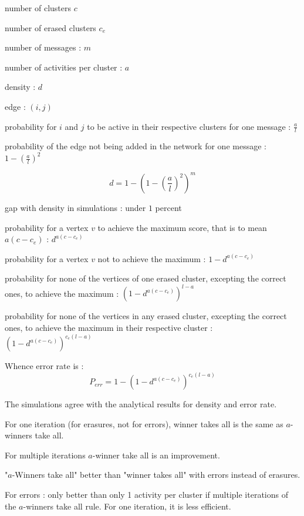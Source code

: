 \documentclass[english,11pt,twocolumn]{article}
\theoremstyle{definition}
\begin{document}
	number of clusters $c$
	
	number of erased clusters $c_e$
	
	number of messages : $m$
	
	number of activities per cluster : $a$
	
	density : $d$

	edge : $(i, j)$
	
	probability for $i$ and $j$ to be active in their respective clusters for one message : $\frac{a}{l}$
	
	probability of the edge	not being added in the network for one message : $1 - \left(\frac{a}{l}\right)^2$
	
			
	\[ d = 1 - \left( 1 - \left(\frac{a}{l}\right)^2 \right)^m \]
	
	gap with density in simulations : under $1$ percent
	
	probability for a vertex $v$ to achieve the maximum score, that is to mean $a(c-c_e)$ : $d^	{a(c-c_e)}$
	
	probability for a vertex $v$	not to achieve the maximum : $1 - d^	{a(c-c_e)}$
	
	probability for none of the vertices of one erased cluster, excepting the correct ones, to achieve the maximum : $\left(1 - d^	{a(c-c_e)}\right)^{l-a}$
	
	probability for none of the vertices in any erased cluster, excepting the correct ones, to achieve the maximum in their respective cluster : $\left(1 - d^	{a(c-c_e)}\right)^{c_e(l-a)}$
	
	Whence error rate is : \[P_{err} = 1 -	\left(1 - d^	{a(c-c_e)}\right)^{c_e(l-a)} \]
	
	The simulations agree with the analytical results for density and error rate.
	

	For one iteration (for erasures, not for errors), winner takes all is the same as $a$-winners take all.
	
	For multiple iterations $a$-winner take all is an improvement.
	
	
	"$a$-Winners take all" better than "winner takes all" with errors instead of erasures.
	
	For errors : only better than only 1 activity per cluster if multiple iterations of the $a$-winners take all rule.
	For one iteration, it is less efficient.
	
\end{document}
